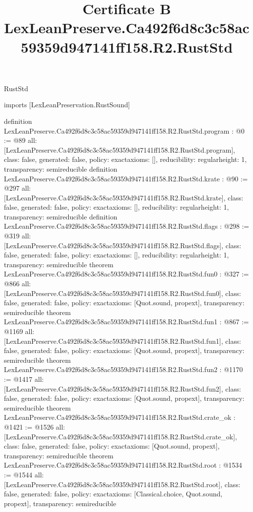 \begin{lexlean}{RustStd}
\title{Certificate B LexLeanPreserve.Ca492f6d8c3c58ac59359d947141ff158.R2.RustStd}
\begin{coremodule}
imports [LexLeanPreservation.RustSound]

definition LexLeanPreserve.Ca492f6d8c3c58ac59359d947141ff158.R2.RustStd.program : @0 := @89 {
  all: [LexLeanPreserve.Ca492f6d8c3c58ac59359d947141ff158.R2.RustStd.program],
  class: false,
  generated: false,
  policy: exact{axioms: []},
  reducibility: regular{height: 1},
  transparency: semireducible
}
definition LexLeanPreserve.Ca492f6d8c3c58ac59359d947141ff158.R2.RustStd.krate : @90 := @297 {
  all: [LexLeanPreserve.Ca492f6d8c3c58ac59359d947141ff158.R2.RustStd.krate],
  class: false,
  generated: false,
  policy: exact{axioms: []},
  reducibility: regular{height: 1},
  transparency: semireducible
}
definition LexLeanPreserve.Ca492f6d8c3c58ac59359d947141ff158.R2.RustStd.flags : @298 := @319 {
  all: [LexLeanPreserve.Ca492f6d8c3c58ac59359d947141ff158.R2.RustStd.flags],
  class: false,
  generated: false,
  policy: exact{axioms: []},
  reducibility: regular{height: 1},
  transparency: semireducible
}
theorem LexLeanPreserve.Ca492f6d8c3c58ac59359d947141ff158.R2.RustStd.fun0 : @327 := @866 {
  all: [LexLeanPreserve.Ca492f6d8c3c58ac59359d947141ff158.R2.RustStd.fun0],
  class: false,
  generated: false,
  policy: exact{axioms: [Quot.sound, propext]},
  transparency: semireducible
}
theorem LexLeanPreserve.Ca492f6d8c3c58ac59359d947141ff158.R2.RustStd.fun1 : @867 := @1169 {
  all: [LexLeanPreserve.Ca492f6d8c3c58ac59359d947141ff158.R2.RustStd.fun1],
  class: false,
  generated: false,
  policy: exact{axioms: [Quot.sound, propext]},
  transparency: semireducible
}
theorem LexLeanPreserve.Ca492f6d8c3c58ac59359d947141ff158.R2.RustStd.fun2 : @1170 := @1417 {
  all: [LexLeanPreserve.Ca492f6d8c3c58ac59359d947141ff158.R2.RustStd.fun2],
  class: false,
  generated: false,
  policy: exact{axioms: [Quot.sound, propext]},
  transparency: semireducible
}
theorem LexLeanPreserve.Ca492f6d8c3c58ac59359d947141ff158.R2.RustStd.crate_ok : @1421 := @1526 {
  all: [LexLeanPreserve.Ca492f6d8c3c58ac59359d947141ff158.R2.RustStd.crate_ok],
  class: false,
  generated: false,
  policy: exact{axioms: [Quot.sound, propext]},
  transparency: semireducible
}
theorem LexLeanPreserve.Ca492f6d8c3c58ac59359d947141ff158.R2.RustStd.root : @1534 := @1544 {
  all: [LexLeanPreserve.Ca492f6d8c3c58ac59359d947141ff158.R2.RustStd.root],
  class: false,
  generated: false,
  policy: exact{axioms: [Classical.choice, Quot.sound, propext]},
  transparency: semireducible
}


\end{coremodule}
\end{lexlean}
